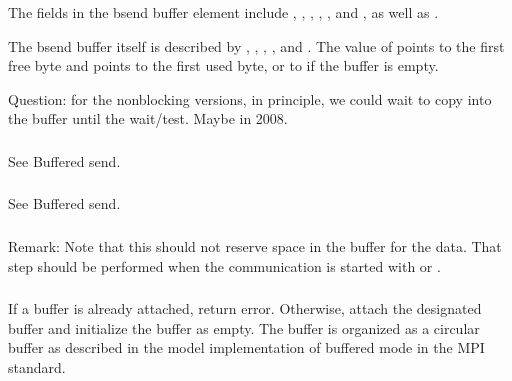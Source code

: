 \documentclass{article}
\begin{document}
The fields in the bsend buffer element include
,
,
,
,
, and 
, as well as .

The bsend buffer itself is described by
, ,
, , and
.  The value of  points
to the first free byte and  points to the first used byte,
or to  if the buffer is empty.

Question: for the nonblocking versions, in principle, we could wait to
copy into the buffer until the wait/test.  Maybe in 2008.





\subsubsection{}
See Buffered send.

\subsubsection{}
See Buffered send.

\subsubsection{}
Remark:  Note that this should not reserve space in the buffer for the
data.  That step should be performed when the communication is started
with  or .

\subsubsection{}

If a buffer is already attached, return error.
Otherwise, attach the designated buffer and initialize the buffer as empty.
The buffer is organized as a circular buffer as described in the model
implementation of buffered mode in the MPI standard.
\end{document}
